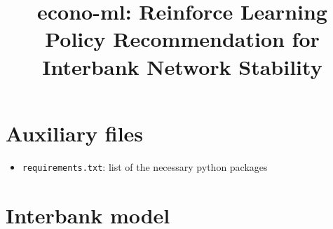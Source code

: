 \documentclass{article}
\title{econo-ml: Reinforce Learning Policy Recommendation for Interbank Network Stability}
\author{}
\date{}
\begin{document}
\maketitle

\section{Auxiliary files}
\begin{itemize}
    \item \texttt{requirements.txt}: list of the necessary python packages
\end{itemize}

\section{Interbank model}
\end{document}
